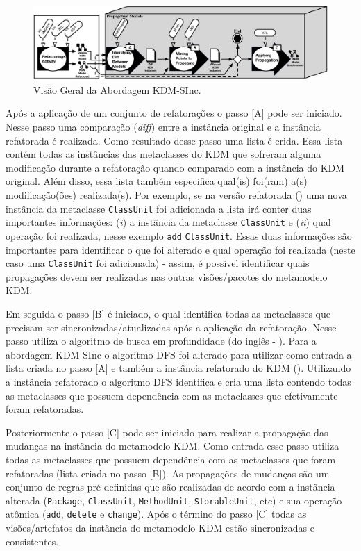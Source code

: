 \begin{figure}[h]
	\centering
	\caption{Visão Geral da Abordagem KDM-SInc.}
	\label{fig:kdm_sinc}
	\includegraphics[scale=0.5]{images/ApproachLifeCicle2}
	\fautor
\end{figure}

Após a aplicação de um conjunto de refatorações o passo [A] pode ser iniciado. Nesse passo uma comparação (\textit{diff}) entre a instância original e a instância refatorada é realizada. Como resultado desse passo uma lista é crida. Essa lista contém todas as instâncias das metaclasses do KDM que sofreram alguma modificação durante a refatoração quando comparado com a instância do KDM original. Além disso, essa lista também especifica qual(is) foi(ram) a(s) modificação(ões) realizada(s). Por exemplo, se na versão refatorada () uma nova instância da metaclasse \texttt{ClassUnit} foi adicionada a lista irá conter duas importantes informações: (\textit{i}) a instância da metaclasse \texttt{ClassUnit} e (\textit{ii}) qual operação foi realizada, nesse exemplo \texttt{add} \texttt{ClassUnit}. Essas duas informações são importantes para identificar o que foi alterado e qual operação foi realizada (neste caso uma \texttt{ClassUnit} foi adicionada) - assim, é possível identificar quais propagações devem ser realizadas nas outras visões/pacotes do metamodelo KDM.

Em seguida o passo [B] é iniciado, o qual identifica todas as metaclasses que precisam ser sincronizadas/atualizadas após a aplicação da refatoração. Nesse passo utiliza o algoritmo de busca em profundidade (do inglês - ). Para a abordagem KDM-SInc o algoritmo DFS foi alterado para utilizar como entrada a lista criada no passo [A] e também a instância refatorado do KDM (). Utilizando a instância refatorado o algoritmo DFS identifica e cria uma lista contendo todas as metaclasses que possuem dependência com as metaclasses que efetivamente foram refatoradas.

Posteriormente o passo [C] pode ser iniciado para realizar a propagação das mudanças na instância do metamodelo KDM. Como entrada esse passo utiliza todas as metaclasses que possuem dependência com as metaclasses que foram refatoradas (lista criada no passo [B]). As propagações de mudanças são um conjunto de regras pré-definidas que são realizadas de acordo com a instância alterada (\texttt{Package}, \texttt{ClassUnit}, \texttt{MethodUnit}, \texttt{StorableUnit}, etc) e sua operação atômica (\texttt{add}, \texttt{delete} e \texttt{change}). Após o término do passo [C] todas as visões/artefatos da instância do metamodelo KDM estão sincronizadas e consistentes.

